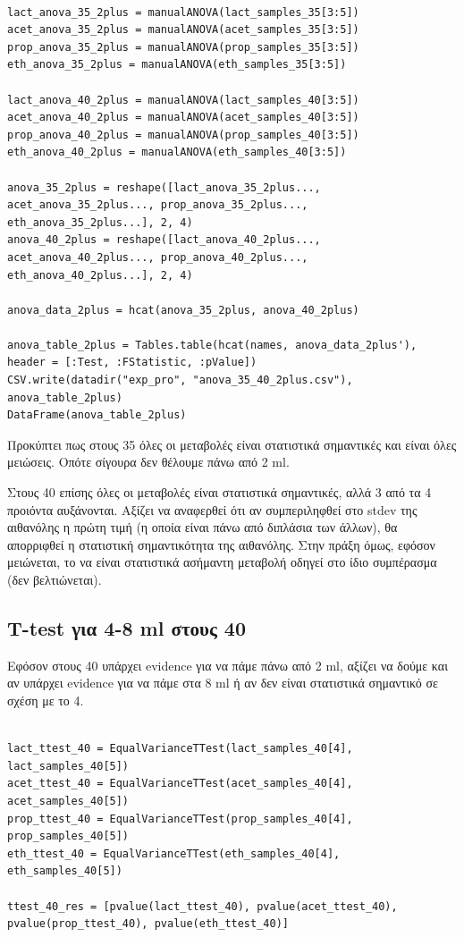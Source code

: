 \documentclass[11pt]{article}
\begin{document}
\begin{verbatim}

lact_anova_35_2plus = manualANOVA(lact_samples_35[3:5])
acet_anova_35_2plus = manualANOVA(acet_samples_35[3:5])
prop_anova_35_2plus = manualANOVA(prop_samples_35[3:5])
eth_anova_35_2plus = manualANOVA(eth_samples_35[3:5])

lact_anova_40_2plus = manualANOVA(lact_samples_40[3:5])
acet_anova_40_2plus = manualANOVA(acet_samples_40[3:5])
prop_anova_40_2plus = manualANOVA(prop_samples_40[3:5])
eth_anova_40_2plus = manualANOVA(eth_samples_40[3:5])

anova_35_2plus = reshape([lact_anova_35_2plus..., acet_anova_35_2plus..., prop_anova_35_2plus..., eth_anova_35_2plus...], 2, 4)
anova_40_2plus = reshape([lact_anova_40_2plus..., acet_anova_40_2plus..., prop_anova_40_2plus..., eth_anova_40_2plus...], 2, 4)

anova_data_2plus = hcat(anova_35_2plus, anova_40_2plus)

anova_table_2plus = Tables.table(hcat(names, anova_data_2plus'), header = [:Test, :FStatistic, :pValue])
CSV.write(datadir("exp_pro", "anova_35_40_2plus.csv"), anova_table_2plus)
DataFrame(anova_table_2plus)

\end{verbatim}

Προκύπτει πως στους 35 όλες οι μεταβολές είναι στατιστικά σημαντικές και είναι όλες μειώσεις. Οπότε σίγουρα δεν θέλουμε πάνω από 2 ml.

Στους 40 επίσης όλες οι μεταβολές είναι στατιστικά σημαντικές, αλλά 3 από τα 4 προιόντα αυξάνονται. Αξίζει να αναφερθεί ότι αν συμπεριληφθεί στο stdev της αιθανόλης η πρώτη τιμή (η οποία είναι πάνω από διπλάσια των άλλων), θα απορριφθεί η στατιστική σημαντικότητα της αιθανόλης. Στην πράξη όμως, εφόσον μειώνεται, το να είναι στατιστικά ασήμαντη μεταβολή οδηγεί στο ίδιο συμπέρασμα (δεν βελτιώνεται).

\subsection{T-test για 4-8 ml στους 40}
\label{sec:orgf0589d6}
Εφόσον στους 40 υπάρχει evidence για να πάμε πάνω από 2 ml, αξίζει να δούμε και αν υπάρχει evidence για να πάμε στα 8 ml ή αν δεν είναι στατιστικά σημαντικό σε σχέση με το 4.

\begin{verbatim}

lact_ttest_40 = EqualVarianceTTest(lact_samples_40[4], lact_samples_40[5])
acet_ttest_40 = EqualVarianceTTest(acet_samples_40[4], acet_samples_40[5])
prop_ttest_40 = EqualVarianceTTest(prop_samples_40[4], prop_samples_40[5])
eth_ttest_40 = EqualVarianceTTest(eth_samples_40[4], eth_samples_40[5])

ttest_40_res = [pvalue(lact_ttest_40), pvalue(acet_ttest_40), pvalue(prop_ttest_40), pvalue(eth_ttest_40)]
\end{verbatim}
\end{document}
